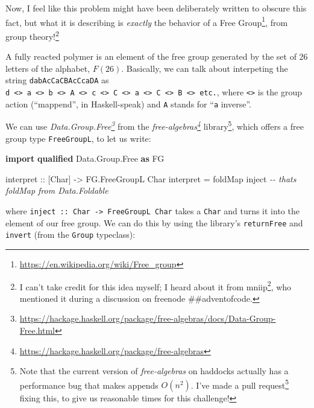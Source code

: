 \documentclass[]{article}
\newenvironment{Shaded}{}{}
\newcommand{\CommentTok}[1]{\textcolor[rgb]{0.38,0.63,0.69}{\textit{#1}}}
\newcommand{\DataTypeTok}[1]{\textcolor[rgb]{0.56,0.13,0.00}{#1}}
\newcommand{\FunctionTok}[1]{\textcolor[rgb]{0.02,0.16,0.49}{#1}}
\newcommand{\KeywordTok}[1]{\textcolor[rgb]{0.00,0.44,0.13}{\textbf{#1}}}
\newcommand{\NormalTok}[1]{#1}
\newcommand{\OtherTok}[1]{\textcolor[rgb]{0.00,0.44,0.13}{#1}}
\renewcommand{\href}[2]{#2\footnote{\url{#1}}}
\begin{document}
Now, I feel like this problem might have been deliberately written to obscure
this fact, but what it is describing is \emph{exactly} the behavior of a
\href{https://en.wikipedia.org/wiki/Free_group}{Free Group}, from group
theory!\footnote{I can't take credit for this idea myself; I heard about it from
  \href{http://mniip.com/}{mniip}, who mentioned it during a discussion on
  freenode \#\#adventofcode.}

A fully reacted polymer is an element of the free group generated by the set of
26 letters of the alphabet, \(F(26)\). Basically, we can talk about interpeting
the string \texttt{dabAcCaCBAcCcaDA} as
\texttt{d\ \textless{}\textgreater{}\ a\ \textless{}\textgreater{}\ b\ \textless{}\textgreater{}\ A\ \textless{}\textgreater{}\ c\ \textless{}\textgreater{}\ C\ \textless{}\textgreater{}\ a\ \textless{}\textgreater{}\ C\ \textless{}\textgreater{}\ B\ \textless{}\textgreater{}\ etc.},
where \texttt{\textless{}\textgreater{}} is the group action (``mappend'', in
Haskell-speak) and \texttt{A} stands for ``\texttt{a} inverse''.

We can use
\emph{\href{https://hackage.haskell.org/package/free-algebras/docs/Data-Group-Free.html}{Data.Group.Free}}
from the
\emph{\href{https://hackage.haskell.org/package/free-algebras}{free-algebras}}
library\footnote{Note that the current version of \emph{free-algebras} on
  haddocks actually has a performance bug that makes appends \(O(n^2)\). I've
  made a \href{https://github.com/coot/free-algebras/pull/4}{pull request}
  fixing this, to give us reasonable times for this challenge!}, which offers a
free group type \texttt{FreeGroupL}, to let us write:

\begin{Shaded}
\begin{Highlighting}[]
\KeywordTok{import} \KeywordTok{qualified} \DataTypeTok{Data.Group.Free} \KeywordTok{as} \DataTypeTok{FG}

\OtherTok{interpret ::}\NormalTok{ [}\DataTypeTok{Char}\NormalTok{] }\OtherTok{{-}>} \DataTypeTok{FG.FreeGroupL} \DataTypeTok{Char}
\NormalTok{interpret }\OtherTok{=} \FunctionTok{foldMap}\NormalTok{ inject          }\CommentTok{{-}{-} that\textquotesingle{}s \textasciigrave{}foldMap\textasciigrave{} from Data.Foldable}
\end{Highlighting}
\end{Shaded}

where \texttt{inject\ ::\ Char\ -\textgreater{}\ FreeGroupL\ Char} takes a
\texttt{Char} and turns it into the element of our free group. We can do this by
using the library's \texttt{returnFree} and \texttt{invert} (from the
\texttt{Group} typeclass):
\end{document}
